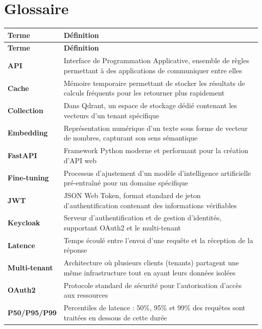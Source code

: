 \documentclass[11pt,a4paper]{report}
\begin{document}

\chapter*{Glossaire}

\begin{longtable}{>{\columncolor{raasLight}\bfseries}p{3.5cm}p{11cm}}
\toprule
\textbf{Terme} & \textbf{Définition} \\
\midrule
\endfirsthead
\toprule
\textbf{Terme} & \textbf{Définition} \\
\midrule
\endhead
API & Interface de Programmation Applicative, ensemble de règles permettant à des applications de communiquer entre elles \\
\midrule
Cache & Mémoire temporaire permettant de stocker les résultats de calculs fréquents pour les retourner plus rapidement \\
\midrule
Collection & Dans Qdrant, un espace de stockage dédié contenant les vecteurs d'un tenant spécifique \\
\midrule
Embedding & Représentation numérique d'un texte sous forme de vecteur de nombres, capturant son sens sémantique \\
\midrule
FastAPI & Framework Python moderne et performant pour la création d'API web \\
\midrule
Fine-tuning & Processus d'ajustement d'un modèle d'intelligence artificielle pré-entraîné pour un domaine spécifique \\
\midrule
JWT & JSON Web Token, format standard de jeton d'authentification contenant des informations vérifiables \\
\midrule
Keycloak & Serveur d'authentification et de gestion d'identités, supportant OAuth2 et le multi-tenant \\
\midrule
Latence & Temps écoulé entre l'envoi d'une requête et la réception de la réponse \\
\midrule
Multi-tenant & Architecture où plusieurs clients (tenants) partagent une même infrastructure tout en ayant leurs données isolées \\
\midrule
OAuth2 & Protocole standard de sécurité pour l'autorisation d'accès aux ressources \\
\midrule
P50/P95/P99 & Percentiles de latence : 50\%, 95\% et 99\% des requêtes sont traitées en dessous de cette durée \\

\end{longtable}
\end{document}
